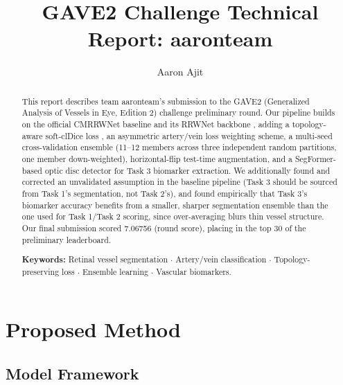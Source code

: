 \documentclass[runningheads]{llncs}
\begin{document}
%
\sloppy
%
\title{GAVE2 Challenge Technical Report: aaronteam}
%
%
\author{Aaron Ajit}
%
%
%
\maketitle
%
\begin{abstract}
This report describes team aaronteam's submission to the GAVE2 (Generalized
Analysis of Vessels in Eye, Edition 2) challenge preliminary round. Our
pipeline builds on the official CMRRWNet baseline and its RRWNet backbone
\cite{morano2024rrwnet}, adding a topology-aware soft-clDice loss
\cite{shit2021cldice}, an asymmetric artery/vein loss weighting scheme, a
multi-seed cross-validation ensemble (11--12 members across three
independent random partitions, one member down-weighted), horizontal-flip
test-time augmentation, and a
SegFormer-based optic disc detector \cite{xie2021segformer} for Task 3
biomarker extraction. We additionally found and corrected an unvalidated
assumption in the baseline pipeline (Task 3 should be sourced from Task 1's
segmentation, not Task 2's), and found empirically that Task 3's biomarker
accuracy benefits from a smaller, sharper segmentation ensemble than the one
used for Task 1/Task 2 scoring, since over-averaging blurs thin vessel
structure. Our final submission scored 7.06756 (round score), placing in the
top 30 of the preliminary leaderboard.

\medskip\noindent\textbf{Keywords:} Retinal vessel segmentation
$\cdot$ Artery/vein classification $\cdot$ Topology-preserving loss
$\cdot$ Ensemble learning $\cdot$ Vascular biomarkers.
\end{abstract}
%
%
%
\section{Proposed Method}

\subsection{Model Framework}
\end{document}
